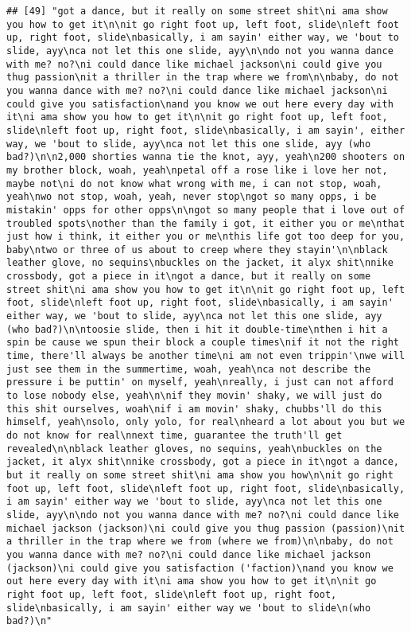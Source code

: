 \documentclass[]{article}
\begin{document}
\begin{verbatim}
## [49] "got a dance, but it really on some street shit\ni ama show you how to get it\n\nit go right foot up, left foot, slide\nleft foot up, right foot, slide\nbasically, i am sayin' either way, we 'bout to slide, ayy\nca not let this one slide, ayy\n\ndo not you wanna dance with me? no?\ni could dance like michael jackson\ni could give you thug passion\nit a thriller in the trap where we from\n\nbaby, do not you wanna dance with me? no?\ni could dance like michael jackson\ni could give you satisfaction\nand you know we out here every day with it\ni ama show you how to get it\n\nit go right foot up, left foot, slide\nleft foot up, right foot, slide\nbasically, i am sayin', either way, we 'bout to slide, ayy\nca not let this one slide, ayy (who bad?)\n\n2,000 shorties wanna tie the knot, ayy, yeah\n200 shooters on my brother block, woah, yeah\npetal off a rose like i love her not, maybe not\ni do not know what wrong with me, i can not stop, woah, yeah\nwo not stop, woah, yeah, never stop\ngot so many opps, i be mistakin' opps for other opps\n\ngot so many people that i love out of troubled spots\nother than the family i got, it either you or me\nthat just how i think, it either you or me\nthis life got too deep for you, baby\ntwo or three of us about to creep where they stayin'\n\nblack leather glove, no sequins\nbuckles on the jacket, it alyx shit\nnike crossbody, got a piece in it\ngot a dance, but it really on some street shit\ni ama show you how to get it\n\nit go right foot up, left foot, slide\nleft foot up, right foot, slide\nbasically, i am sayin' either way, we 'bout to slide, ayy\nca not let this one slide, ayy (who bad?)\n\ntoosie slide, then i hit it double-time\nthen i hit a spin be cause we spun their block a couple times\nif it not the right time, there'll always be another time\ni am not even trippin'\nwe will just see them in the summertime, woah, yeah\nca not describe the pressure i be puttin' on myself, yeah\nreally, i just can not afford to lose nobody else, yeah\n\nif they movin' shaky, we will just do this shit ourselves, woah\nif i am movin' shaky, chubbs'll do this himself, yeah\nsolo, only yolo, for real\nheard a lot about you but we do not know for real\nnext time, guarantee the truth'll get revealed\n\nblack leather gloves, no sequins, yeah\nbuckles on the jacket, it alyx shit\nnike crossbody, got a piece in it\ngot a dance, but it really on some street shit\ni ama show you how\n\nit go right foot up, left foot, slide\nleft foot up, right foot, slide\nbasically, i am sayin' either way we 'bout to slide, ayy\nca not let this one slide, ayy\n\ndo not you wanna dance with me? no?\ni could dance like michael jackson (jackson)\ni could give you thug passion (passion)\nit a thriller in the trap where we from (where we from)\n\nbaby, do not you wanna dance with me? no?\ni could dance like michael jackson (jackson)\ni could give you satisfaction ('faction)\nand you know we out here every day with it\ni ama show you how to get it\n\nit go right foot up, left foot, slide\nleft foot up, right foot, slide\nbasically, i am sayin' either way we 'bout to slide\n(who bad?)\n"                                                                                                                                                                                
\end{verbatim}
\end{document}
